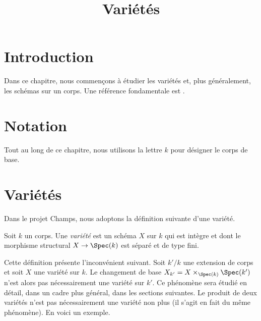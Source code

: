 

%


\title{Variétés}


\maketitle

\label{section-phantom}

\tableofcontents

\section{Introduction}
\label{section-introduction}

\noindent
Dans ce chapitre, nous commençons à étudier les variétés et, plus
généralement, les schémas sur un corps. Une référence fondamentale est \cite{EGA}.








\section{Notation}
\label{section-notation}

\noindent
Tout au long de ce chapitre, nous utilisons la lettre $k$ pour désigner le corps de base.










\section{Variétés}
\label{section-varieties}

\noindent
Dans le projet Champs, nous adoptons la définition suivante
d'une variété.

\begin{definition}
\label{definition-variety}
Soit $k$ un corps. Une {\it variété} est un schéma $X$ sur $k$
qui est intègre et dont le morphisme structural
$X \to \Spec(k)$ est séparé et de type fini.
\end{definition}

\noindent
Cette définition présente l'inconvénient suivant. Soit $k'/k$
une extension de corps et soit $X$ une variété sur $k$. Le changement
de base $X_{k'} = X \times_{\Spec(k)} \Spec(k')$ n'est alors
pas nécessairement une variété sur $k'$. Ce phénomène sera étudié
en détail, dans un cadre plus général, dans les sections suivantes.
Le produit de deux variétés n'est pas nécessairement une variété non
plus (il s'agit en fait du même phénomène).
En voici un exemple.



